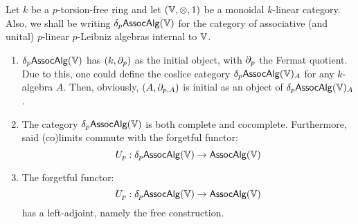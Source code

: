                     \begin{proposition}
                        Let $k$ be a $p$-torsion-free ring and let $(\V, \tensor, 1)$ be a monoidal $k$-linear category. Also, we shall be writing $\delta_p\mathsf{Assoc}\mathsf{Alg}(\mathbb{V})$ for the category of associative (and unital) $p$-linear $p$-Leibniz algebras internal to $\mathbb{V}$. 
                            \begin{enumerate}
                                \item $\delta_p\mathsf{Assoc}\mathsf{Alg}(\mathbb{V})$ has $(k, \partial_p)$ as the initial object, with $\partial_p$ the Fermat quotient. Due to this, one could define the coslice category $\delta_p\mathsf{Assoc}\mathsf{Alg}(\mathbb{V})_A$ for any $k$-algebra $A$. Then, obviously, $(A, \partial_{p,A})$ is initial as an object of $\delta_p\mathsf{Assoc}\mathsf{Alg}(\mathbb{V})_A$.
                                \item The category $\delta_p\mathsf{Assoc}\mathsf{Alg}(\mathbb{V})$ is both complete and cocomplete. Furthermore, said (co)limits commute with the forgetful functor:
                                    $$U_p: \delta_p\mathsf{Assoc}\mathsf{Alg}(\mathbb{V}) \to \mathsf{Assoc}\mathsf{Alg}(\mathbb{V})$$
                                \item The forgetful functor:
                                    $$U_p: \delta_p\mathsf{Assoc}\mathsf{Alg}(\mathbb{V}) \to \mathsf{Assoc}\mathsf{Alg}(\mathbb{V})$$
                                has a left-adjoint, namely the free construction.
                            \end{enumerate}
                    \end{proposition}
    
